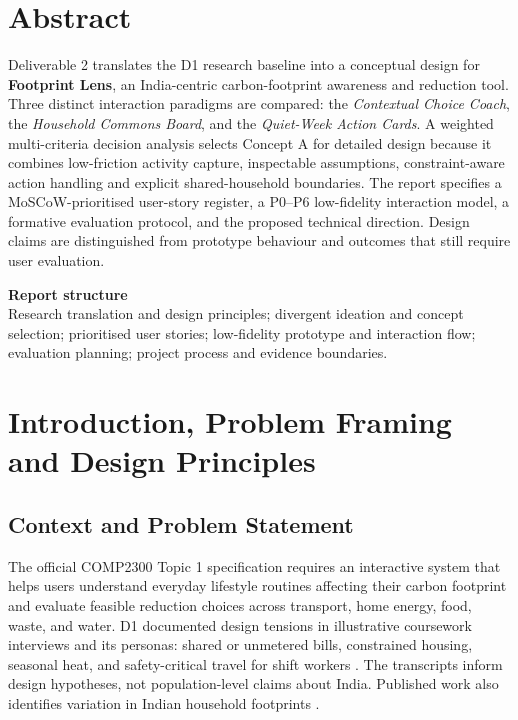 \documentclass[12pt,a4paper]{article}
\begin{document}
\section*{Abstract}
Deliverable 2 translates the D1 research baseline into a conceptual design for \textbf{Footprint Lens}, an India-centric carbon-footprint awareness and reduction tool. Three distinct interaction paradigms are compared: the \emph{Contextual Choice Coach}, the \emph{Household Commons Board}, and the \emph{Quiet-Week Action Cards}. A weighted multi-criteria decision analysis selects Concept A for detailed design because it combines low-friction activity capture, inspectable assumptions, constraint-aware action handling and explicit shared-household boundaries. The report specifies a MoSCoW-prioritised user-story register, a P0--P6 low-fidelity interaction model, a formative evaluation protocol, and the proposed technical direction. Design claims are distinguished from prototype behaviour and outcomes that still require user evaluation.

\vspace{0.4cm}
\begin{keybox}
\textbf{\sffamily\color{Navy}Report structure}\\
Research translation and design principles; divergent ideation and concept selection; prioritised user stories; low-fidelity prototype and interaction flow; evaluation planning; project process and evidence boundaries.
\end{keybox}

\clearpage
\tableofcontents
\clearpage
{}
\setcounter{page}{1}

\section{Introduction, Problem Framing and Design Principles}

\subsection{Context and Problem Statement}
The official COMP2300 Topic 1 specification requires an interactive system that helps users understand everyday lifestyle routines affecting their carbon footprint and evaluate feasible reduction choices across transport, home energy, food, waste, and water. D1 documented design tensions in illustrative coursework interviews and its personas: shared or unmetered bills, constrained housing, seasonal heat, and safety-critical travel for shift workers \cite{d1report}. The transcripts inform design hypotheses, not population-level claims about India. Published work also identifies variation in Indian household footprints \cite{lee2021}. 
\end{document}

